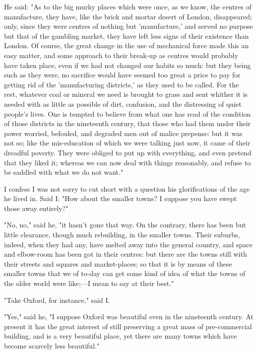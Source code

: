 He said: "As to the big murky places which were once, as we know, the
centres of manufacture, they have, like the brick and mortar desert of
London, disappeared; only, since they were centres of nothing but
'manufacture,' and served no purpose but that of the gambling market,
they have left less signs of their existence than London. Of course, the
great change in the use of mechanical force made this an easy matter,
and some approach to their break-up as centres would probably have taken
place, even if we had not changed our habits so much: but they being
such as they were, no sacrifice would have seemed too great a price to
pay for getting rid of the 'manufacturing districts,' as they used to be
called. For the rest, whatever coal or mineral we need is brought to
grass and sent whither it is needed with as little as possible of dirt,
confusion, and the distressing of quiet people's lives. One is tempted
to believe from what one has read of the condition of those districts in
the nineteenth century, that those who had them under their power
worried, befouled, and degraded men out of malice prepense: but it was
not so; like the mis-education of which we were talking just now, it
came of their dreadful poverty. They were obliged to put up with
everything, and even pretend that they liked it; whereas we can now deal
with things reasonably, and refuse to be saddled with what we do not
want."

I confess I was not sorry to cut short with a question his
glorifications of the age he lived in. Said I: "How about the smaller
towns? I suppose you have swept those away entirely?"

"No, no," said he, "it hasn't gone that way. On the contrary, there has
been but little clearance, though much rebuilding, in the smaller towns.
Their suburbs, indeed, when they had any, have melted away into the
general country, and space and elbow-room has been got in their centres:
but there are the towns still with their streets and squares and
market-places; so that it is by means of these smaller towns that we of
to-day can get some kind of idea of what the towns of the older world
were like;---I mean to say at their best."

"Take Oxford, for instance," said I.

"Yes," said he, "I suppose Oxford was beautiful even in the nineteenth
century. At present it has the great interest of still preserving a
great mass of pre-commercial building, and is a very beautiful place,
yet there are many towns which have become scarcely less beautiful."

